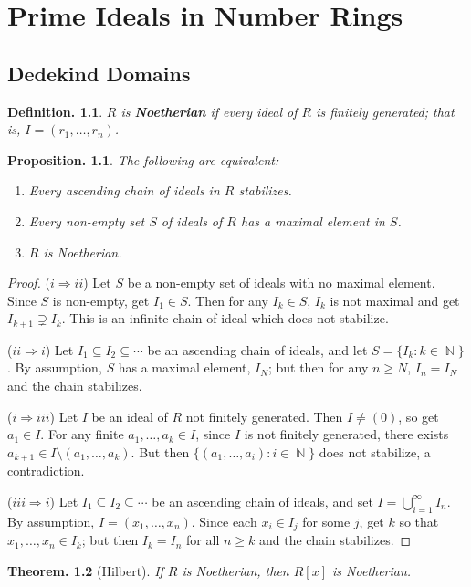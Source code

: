 \documentclass[11pt, a4paper]{memoir}
\DeclareMathOperator{\N}{{\mathbb{N}}}
\newcommand{\impendc}{\hspace{0.3cm}}
\newcommand{\iimp}[2]{($#1\Rightarrow#2$)}
\newcommand{\imp}[2]{\iimp{#1}{#2}\impendc}
\theoremstyle{change}
\newtheorem{theorem}{Theorem.}[section]
\newtheorem{proposition}[theorem]{Proposition.}
\theoremstyle{plain}
\theoremstyle{nonumberplain}
\newtheorem{definition}{Definition.}
\newtheorem{proof}{Proof}
\newcommand{\mbf}[1]{{\boldmath\bfseries #1}}
\numberwithin{equation}{section}
\begin{document}
\chapter{Prime Ideals in Number Rings}
\section{Dedekind Domains}
\begin{definition}
    $R$ is \mbf{Noetherian} if every ideal of $R$ is finitely generated; that is, $I=(r_1,\ldots,r_n)$.
\end{definition}
\begin{proposition}\label{t:noe}
    The following are equivalent:
    \begin{enumerate}[nl,r]
        \item Every ascending chain of ideals in $R$ stabilizes.
        \item Every non-empty set $S$ of ideals of $R$ has a maximal element in $S$.
        \item $R$ is Noetherian.
    \end{enumerate}
\end{proposition}
\begin{proof}
    \imp{i}{ii}
    Let $S$ be a non-empty set of ideals with no maximal element.
    Since $S$ is non-empty, get $I_1\in S$.
    Then for any $I_k\in S$, $I_k$ is not maximal and get $I_{k+1}\supsetneq I_k$.
    This is an infinite chain of ideal which does not stabilize.

    \imp{ii}{i}
    Let $I_1\subseteq I_2\subseteq\cdots$ be an ascending chain of ideals, and let $S=\{I_k:k\in\N\}$.
    By assumption, $S$ has a maximal element, $I_N$; but then for any $n\geq N$, $I_n=I_N$ and the chain stabilizes.

    \imp{i}{iii}
    Let $I$ be an ideal of $R$ not finitely generated.
    Then $I\neq(0)$, so get $a_1\in I$.
    For any finite $a_1,\ldots,a_k\in I$, since $I$ is not finitely generated, there exists $a_{k+1}\in I\setminus(a_1,\ldots,a_k)$.
    But then $\{(a_1,\ldots,a_i):i\in\N\}$ does not stabilize, a contradiction.

    \imp{iii}{i}
    Let $I_1\subseteq I_2\subseteq\cdots$ be an ascending chain of ideals, and set $I=\bigcup_{i=1}^\infty I_n$.
    By assumption, $I=(x_1,\ldots,x_n)$.
    Since each $x_i\in I_j$ for some $j$, get $k$ so that $x_1,\ldots,x_n\in I_k$; but then $I_k=I_n$ for all $n\geq k$ and the chain stabilizes.
\end{proof}
\begin{theorem}[Hilbert]
    If $R$ is Noetherian, then $R[x]$ is Noetherian.
\end{theorem}
\end{document}
